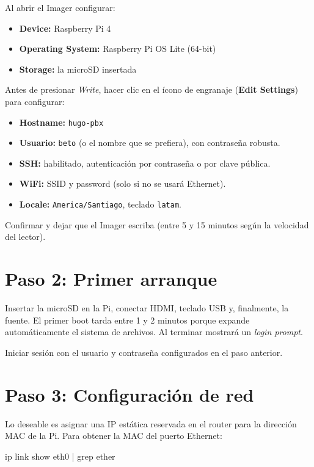 Al abrir el Imager configurar:

\begin{itemize}
  \item \textbf{Device:} Raspberry Pi 4
  \item \textbf{Operating System:} Raspberry Pi OS Lite (64-bit)
  \item \textbf{Storage:} la microSD insertada
\end{itemize}

Antes de presionar \emph{Write}, hacer clic en el ícono de engranaje (\textsf{\textbf{\textcolor{hugoblue}{Edit Settings}}}) para configurar:

\begin{itemize}
  \item \textbf{Hostname:} \texttt{hugo-pbx}
  \item \textbf{Usuario:} \texttt{beto} (o el nombre que se prefiera), con contraseña robusta.
  \item \textbf{SSH:} habilitado, autenticación por contraseña o por clave pública.
  \item \textbf{WiFi:} SSID y password (solo si no se usará Ethernet).
  \item \textbf{Locale:} \texttt{America/Santiago}, teclado \texttt{latam}.
\end{itemize}

Confirmar y dejar que el Imager escriba (entre 5 y 15 minutos según la velocidad del lector).

\section{Paso 2: Primer arranque}

Insertar la microSD en la Pi, conectar HDMI, teclado USB y, finalmente, la fuente. El primer boot tarda entre 1 y 2 minutos porque expande automáticamente el sistema de archivos. Al terminar mostrará un \emph{login prompt}.

Iniciar sesión con el usuario y contraseña configurados en el paso anterior.

\section{Paso 3: Configuración de red}

Lo deseable es asignar una IP estática reservada en el router para la dirección MAC de la Pi. Para obtener la MAC del puerto Ethernet:

\begin{shellcode}
ip link show eth0 | grep ether
\end{shellcode}

